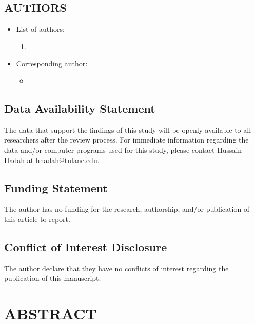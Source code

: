 \documentclass[12pt,english]{article}
\begin{document}
\subsection*{AUTHORS}
\begin{itemize}[label={}, leftmargin=*]
    \item List of authors:
    \begin{enumerate}
        \item \AUTHORHADAHINFO
    \end{enumerate}
    \item Corresponding author:
    \begin{itemize}
        \item \textbf{\AUTHORHADAHINFO}
    \end{itemize}
\end{itemize}

\subsection*{Data Availability Statement}
The data that support the findings of this study will be openly available to all researchers after the review process. For immediate information regarding the data and/or computer programs used for this study, please contact Hussain Hadah at hhadah@tulane.edu.

\subsection*{Funding Statement}

The author has no funding for the research, authorship, and/or publication of this article to report.

\subsection*{Conflict of Interest Disclosure}
The author declare that they have no conflicts of interest regarding the publication of this manuscript.

\clearpage 

\doublespacing
\section*{ABSTRACT}
\PAPERABSTRACT
\clearpage 

\doublespacing
\end{document}
